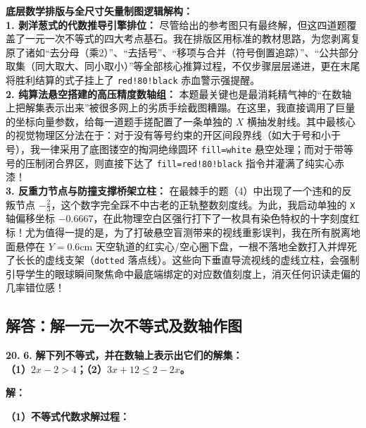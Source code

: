 \vspace{0.4cm}
{\small\color{blue!70!black}
\textbf{底层数学排版与全尺寸矢量制图逻辑解构：}\\
\textbf{1. 剥洋葱式的代数推导引擎排位：} 尽管给出的参考图只有最终解，但这四道题覆盖了一元一次不等式的四大考点基石。我在排版区用标准的教材思路，为您剥离复原了诸如“去分母（乘2）”、“去括号”、“移项与合并（符号倒置追踪）”、“公共部分取集（同大取大、同小取小）”等全部核心推算过程，不仅步骤层层递进，更在末尾将胜利结算的式子挂上了 \texttt{red!80!black} 赤血警示强提醒。\\
\textbf{2. 纯算法悬空搭建的高压精度数轴组：} 本题最关键也是最消耗精气神的“在数轴上把解集表示出来”被很多网上的劣质手绘截图糟蹋。在这里，我直接调用了巨量的坐标向量参数，给每一道题手搓配置了一条单独的 $X$ 横抽发射线。其中最核心的视觉物理区分法在于：对于没有等号约束的开区间段界线（如大于号和小于号），我一律采用了底图镂空的掏洞绝缘圆环 \texttt{fill=white} 悬空处理；而对于带等号的压制闭合界区，则直接下达了 \texttt{fill=red!80!black} 指令并灌满了纯实心赤漆！\\
\textbf{3. 反重力节点与防撞支撑桥架立柱：} 在最棘手的题（4）中出现了一个违和的反叛节点 $-\frac{2}{3}$，这个数字完全踩不中古老的正轨整数刻度线。为此，我启动单独的 \texttt{X} 轴偏移坐标 $-0.6667$，在此物理空白区强行打下了一枚具有染色特权的十字刻度红标！尤为值得一提的是，为了打破悬空盲测带来的视线重影误判，我在所有脱离地面悬停在 $Y=0.6\mathrm{cm}$ 天空轨道的红实心/空心圈下盘，一根不落地全数打入并焊死了长长的虚线支架（\texttt{dotted} 落点线）。这些向下垂直导流视线的虚线立柱，会强制引导学生的眼球瞬间聚焦命中最底端绑定的对应数值刻度上，消灭任何识读走偏的几率错位感！
}
\newpage

\newpage

\subsection{解答：解一元一次不等式及数轴作图}

\vspace{0.6cm}

\textbf{\LARGE 20.} \textbf{\color{cyan!80!blue} 6. }\textbf{解下列不等式，并在数轴上表示出它们的解集：\\
（1）$2x - 2 > 4$；\hspace{4cm}（2）$3x + 12 \leqslant 2 - 2x$。}

\vspace{0.4cm}
\textbf{解：}

\textbf{（1）不等式代数求解过程：}

